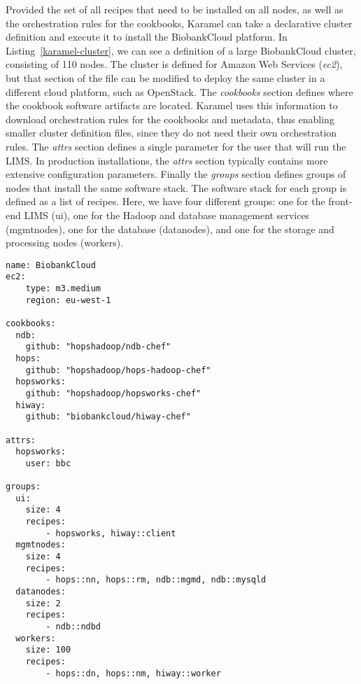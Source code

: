 Provided the set of all recipes that need to be installed on all nodes, as well as the orchestration rules for the cookbooks, Karamel can take a declarative cluster definition and execute it to install the BiobankCloud platform. In Listing~\ref{karamel-cluster}, we can see a definition of a large BiobankCloud cluster, consisting of 110 nodes. The cluster is defined for Amazon Web Services (\textit{ec2}), but that section of the file can be modified to deploy the same cluster in a different cloud platform, such as OpenStack. The \textit{cookbooks} section defines where the cookbook software artifacts are located. Karamel uses this information to download orchestration rules for the cookbooks and metadata, thus enabling smaller cluster definition files, since they do not need their own orchestration rules. The \textit{attrs} section defines a single parameter for the user that will run the LIMS. In production installations, the \textit{attrs} section typically contains more extensive configuration parameters. Finally the \textit{groups} section defines groups of nodes that install the same software stack. The software stack for each group is defined as a list of recipes. Here, we have four different groups: one for the front-end LIMS (ui), one for the Hadoop and database management services (mgmtnodes), one for the database (datanodes), and one for the storage and processing nodes (workers).

\begin{lstlisting}[frame=shadowbox,label=karamel-cluster,caption=Karamel Cluster Definition for BiobankCloud,float=t]
name: BiobankCloud
ec2:
    type: m3.medium
    region: eu-west-1

cookbooks:
  ndb: 
    github: "hopshadoop/ndb-chef"
  hops: 
    github: "hopshadoop/hops-hadoop-chef"
  hopsworks: 
    github: "hopshadoop/hopsworks-chef"
  hiway: 
    github: "biobankcloud/hiway-chef"
    
attrs:
  hopsworks:
    user: bbc
    
groups: 
  ui:
    size: 4
    recipes: 
        - hopsworks, hiway::client
  mgmtnodes:
    size: 4
    recipes: 
        - hops::nn, hops::rm, ndb::mgmd, ndb::mysqld
  datanodes:
    size: 2
    recipes: 
        - ndb::ndbd
  workers:
    size: 100
    recipes: 
        - hops::dn, hops::nm, hiway::worker
\end{lstlisting}
